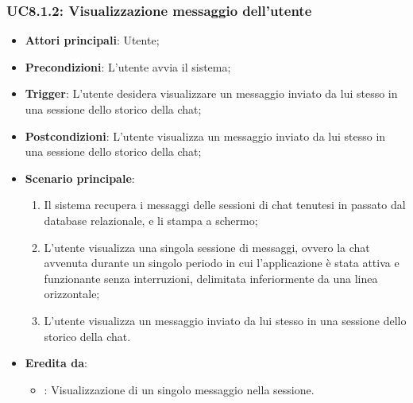\subsubsection{UC8.1.2: Visualizzazione messaggio dell'utente}
\begin{itemize}
    \item \textbf{Attori principali}: Utente;
    \item \textbf{Precondizioni}: L'utente avvia il sistema;
    \item \textbf{Trigger}: L'utente desidera visualizzare un messaggio inviato da lui stesso in una sessione dello storico della chat;
    \item \textbf{Postcondizioni}: L'utente visualizza un messaggio inviato da lui stesso in una sessione dello storico della chat;
    \item \textbf{Scenario principale}:
    \begin{enumerate}
        \item Il sistema recupera i messaggi delle sessioni di chat tenutesi in passato dal database relazionale, e li stampa a schermo;
        \item L'utente visualizza una singola sessione di messaggi, ovvero la chat avvenuta durante un singolo periodo in cui l'applicazione
        è stata attiva e funzionante senza interruzioni, delimitata inferiormente da una linea orizzontale;
        \item L'utente visualizza un messaggio inviato da lui stesso in una sessione dello storico della chat.
    \end{enumerate}
    \item \textbf{Eredita da}:
    \begin{itemize}
        \item {}: Visualizzazione di un singolo messaggio nella sessione.
    \end{itemize}
\end{itemize}

\hypertarget{UC8.1.3}{}
